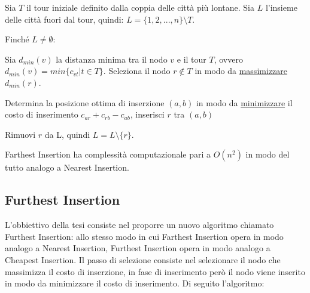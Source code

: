 \documentclass[a4paper,12pt]{report}
\begin{document}
\begin{tcolorbox}[colframe=black,colback=white,boxrule=0.5pt, sharp corners]
\begin{legal}
  \item Sia $T$ il tour iniziale definito dalla coppia delle città più lontane. Sia $L$ l'insieme delle città fuori dal tour, quindi: $L = \{1, 2, ..., n\} \setminus T$.
  \item Finché $L \neq \emptyset$:
  \begin{legal}
    \item Sia $d_{min}(v)$ la distanza minima tra il nodo $v$ e il tour $T$, ovvero $d_{min}(v) = min\{c_{vt} | t \in T \}$. Seleziona il nodo $r \not \in T$ in modo da \underline{massimizzare} $d_{min}(r)$.
    \item Determina la posizione ottima di inserzione $(a, b)$ in modo da \underline{minimizzare} il costo di inserimento $c_{ar} + c_{rb} - c_{ab}$, inserisci $r$ tra $(a, b)$
    \item Rimuovi $r$ da L, quindi $L = L \setminus \{r\}$.
  \end{legal}
\end{legal}
\end{tcolorbox}
\hfill \break Farthest Insertion ha complessità computazionale pari a $O(n^2)$ in modo del tutto analogo a Nearest Insertion.

\subsection{Furthest Insertion} \label{ssec:FuI}
L'obbiettivo della tesi consiste nel proporre un nuovo algoritmo chiamato Furthest Insertion: allo stesso modo in cui Farthest Insertion opera in modo analogo a Nearest Insertion, Furthest Insertion opera in modo analogo a Cheapest Insertion. Il passo di selezione consiste nel selezionare il nodo che massimizza il costo di inserzione, in fase di inserimento però il nodo viene inserito in modo da minimizzare il costo di inserimento. Di seguito l'algoritmo:
\end{document}
